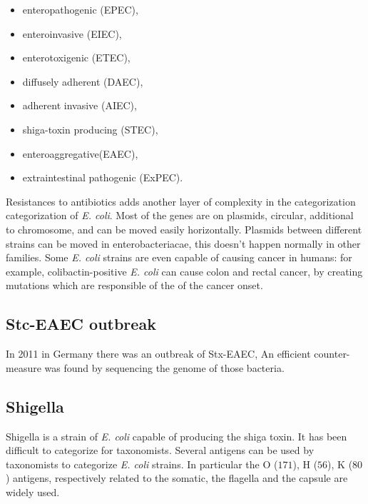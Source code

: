     \begin{multicols}{2}
        \begin{itemize}
            \item enteropathogenic (EPEC),
            \item enteroinvasive (EIEC),
            \item enterotoxigenic (ETEC),
            \item diffusely adherent (DAEC),
            \item adherent invasive (AIEC),
            \item shiga-toxin producing (STEC),
            \item enteroaggregative(EAEC),
            \item extraintestinal pathogenic (ExPEC).
        \end{itemize}
    \end{multicols}

    Resistances to antibiotics adds another layer of complexity in the categorization categorization of \emph{E. coli}.
    Most of the genes are on plasmids, circular, additional to chromosome, and can be moved easily horizontally. Plasmids between different strains can be moved in enterobacteriacae, this doesn't happen normally in other families.
    Some \emph{E. coli} strains are even capable of causing cancer in humans: for example, colibactin-positive \emph{E. coli} can cause colon and rectal cancer, by creating mutations which are responsible of the of the cancer onset.

    \subsection{Stc-EAEC outbreak}
    In 2011 in Germany there was an outbreak of Stx-EAEC,
    An efficient counter-measure was found by sequencing the genome of those bacteria.

    \subsection{Shigella}
    Shigella is a strain of \emph{E. coli} capable of producing the shiga toxin.
    It has been difficult to categorize for taxonomists.
    Several antigens can be used by taxonomists to categorize \emph{E. coli} strains.
    In particular the O ($171$), H ($56$), K ($80$) antigens, respectively related to the somatic, the flagella and the capsule are widely used.

